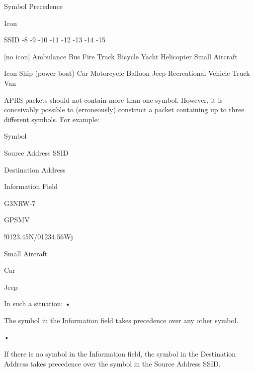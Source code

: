 Symbol Precedence

Icon

SSID
-8
-9
-10
-11
-12
-13
-14
-15

[no icon]
Ambulance
Bus
Fire Truck
Bicycle
Yacht
Helicopter
Small Aircraft

Icon
Ship (power boat)
Car
Motorcycle
Balloon
Jeep
Recreational Vehicle
Truck
Van

APRS packets should not contain more than one symbol. However, it is
conceivably possible to (erroneously) construct a packet containing up to
three different symbols.
For example:

Symbol

Source
Address SSID

Destination
Address

Information Field

G3NRW-7

GPSMV

!0123.45N/01234.56Wj

Small Aircraft

Car

Jeep

In such a situation:
•

The symbol in the Information field takes precedence over any other
symbol.

•

If there is no symbol in the Information field, the symbol in the
Destination Address takes precedence over the symbol in the Source
Address SSID.

